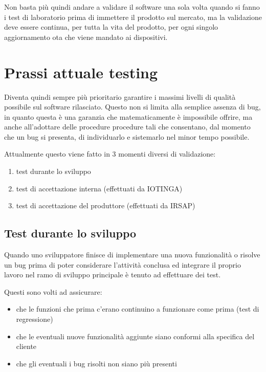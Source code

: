 \documentclass[12pt,a4paper,twoside,titlepage]{book}
\begin{document}
Non basta più quindi andare a validare il software una sola volta quando si fanno i test 
di laboratorio prima di immettere il prodotto sul mercato, ma la validazione deve essere continua, 
per tutta la vita del prodotto, per ogni singolo aggiornamento \acrfull{ota} che viene mandato 
ai dispositivi. 

\section{Prassi attuale testing}

Diventa quindi sempre più prioritario garantire i massimi livelli di qualità possibile
sul software rilasciato. Questo non si limita alla semplice assenza di bug, in quanto
questa è una garanzia che matematicamente è impossibile offrire, ma anche all'adottare
delle procedure procedure tali che consentano, dal momento che un bug si
presenta, di individuarlo e sistemarlo nel minor tempo possibile.

Attualmente questo viene fatto in 3 momenti diversi di validazione:

\begin{enumerate}
    \item test durante lo sviluppo
    \item test di accettazione interna (effettuati da IOTINGA)
    \item test di accettazione del produttore (effettuati da IRSAP)
\end{enumerate}

\subsection{Test durante lo sviluppo}
\label{subsection:test_sviluppo}

Quando uno sviluppatore finisce di implementare una nuova funzionalità o risolve un
bug prima di poter considerare l'attività conclusa ed integrare il
proprio lavoro nel ramo di sviluppo principale è tenuto ad effettuare dei test.

Questi sono volti ad assicurare:
\begin{itemize}
    \item che le funzioni che prima c'erano continuino a funzionare come prima (test di regressione)
    \item che le eventuali nuove funzionalità aggiunte siano conformi alla specifica del cliente
    \item che gli eventuali i bug risolti non siano più presenti 
\end{itemize}
\end{document}
